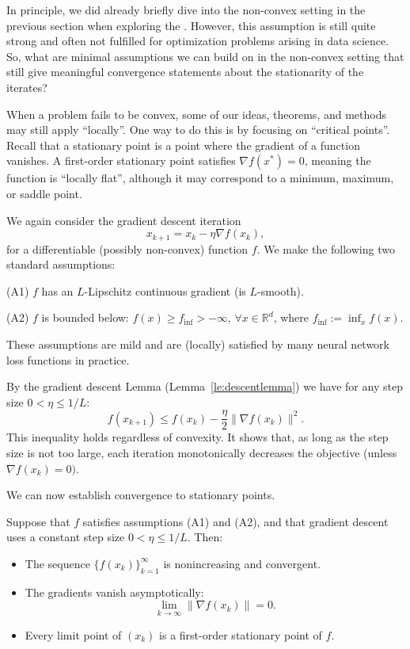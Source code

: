 In principle, we did already briefly dive into the non-convex setting in the previous section when exploring the \PLC. However, this assumption is still quite strong and often not fulfilled for optimization problems arising in data science.
So, what are minimal assumptions we can build on in the non-convex setting that still give meaningful convergence statements about the stationarity of the iterates?

When a problem fails to be convex, some of our ideas, theorems, and methods may still apply ``locally''. One way to do this is by focusing on ``critical points''.
Recall that a stationary point is a point where the gradient of a function vanishes. A first-order stationary point satisfies $\nabla f(x^\ast) = 0$, meaning the function is ``locally flat'', although it may correspond to a minimum, maximum, or saddle point.  

We again consider the gradient descent iteration
$$
x_{k+1} = x_k - \eta \nabla f(x_k),
$$
for a differentiable (possibly non-convex) function $f$.
We make the following two standard assumptions: 

\smallskip
\noindent
(A1) $f$ has an $L$-Lipschitz continuous gradient (is $L$-smooth). 

\smallskip
\noindent
(A2) $f$ is bounded below:
$f(x) \ge f_{\inf} > -\infty, \, \forall x\in\mathbb{R}^d$, where $f_{\inf}:= \inf_{x} f(x)$.

\smallskip
These assumptions are mild and are (locally) satisfied by many neural network loss functions in practice.


By the gradient descent Lemma (Lemma~\ref{le:descentlemma}) we have for any step size $0 < \eta \le 1/L$:
\begin{equation}
\label{descentlemma2}    
f(x_{k+1}) \le f(x_k) - \frac{\eta}{2}\|\nabla f(x_k)\|^2.
\end{equation}
This inequality holds regardless of convexity.
It shows that, as long as the step size is not too large, each iteration monotonically decreases the objective (unless $\nabla f(x_k)=0)$.


We can now establish convergence to stationary points.

\begin{theorem}\label{th:stationary}
Suppose that $f$ satisfies assumptions (A1) and (A2), and that gradient descent uses a constant step size $0 < \eta \le 1/L$.
Then:   
\begin{itemize}
\item[(a)]  The sequence $\{f(x_k)\}_{k=1}^{\infty}$ is nonincreasing and convergent. 
\item[(b)] The gradients vanish asymptotically:
   $$
   \lim_{k \to \infty} \|\nabla f(x_k)\| = 0.
   $$
\item[(c)] Every limit point of $(x_k)$ is a first-order stationary point of $f$.
\end{itemize}

\end{theorem}

